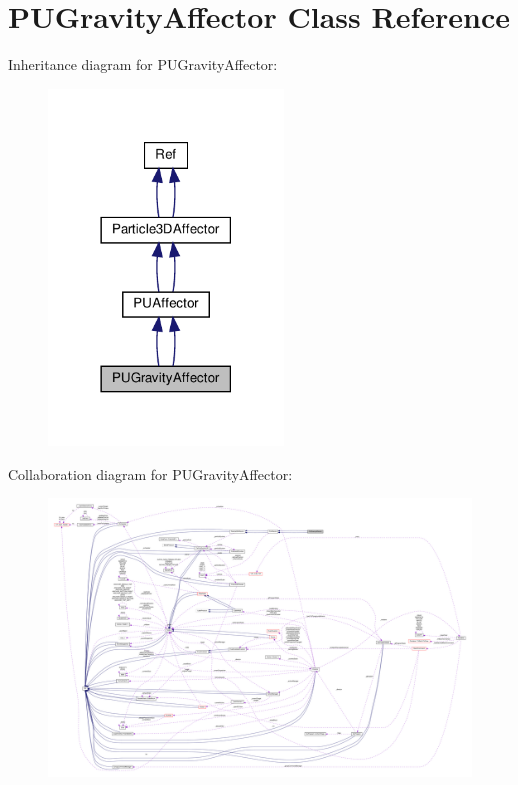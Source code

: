 \hypertarget{classPUGravityAffector}{}\section{P\+U\+Gravity\+Affector Class Reference}
\label{classPUGravityAffector}


Inheritance diagram for P\+U\+Gravity\+Affector\+:
\nopagebreak
\begin{figure}[H]
\begin{center}
\leavevmode
\includegraphics[width=177pt]{classPUGravityAffector__inherit__graph}
\end{center}
\end{figure}


Collaboration diagram for P\+U\+Gravity\+Affector\+:
\nopagebreak
\begin{figure}[H]
\begin{center}
\leavevmode
\includegraphics[width=350pt]{classPUGravityAffector__coll__graph}
\end{center}
\end{figure}
